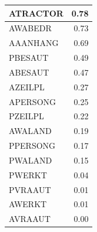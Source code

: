 \documentclass[
  12pt,
  oneside]{report}
\begin{document}
\begin{table}[H]
\begin{tabular}[t]{l|r}
\hline
ATRACTOR & 0.78\\
\hline
AWABEDR & 0.73\\
\hline
AAANHANG & 0.69\\
\hline
PBESAUT & 0.49\\
\hline
ABESAUT & 0.47\\
\hline
AZEILPL & 0.27\\
\hline
APERSONG & 0.25\\
\hline
PZEILPL & 0.22\\
\hline
AWALAND & 0.19\\
\hline
PPERSONG & 0.17\\
\hline
PWALAND & 0.15\\
\hline
PWERKT & 0.04\\
\hline
PVRAAUT & 0.01\\
\hline
AWERKT & 0.01\\
\hline
AVRAAUT & 0.00\\
\hline
\end{tabular}
\end{table}
\end{document}
